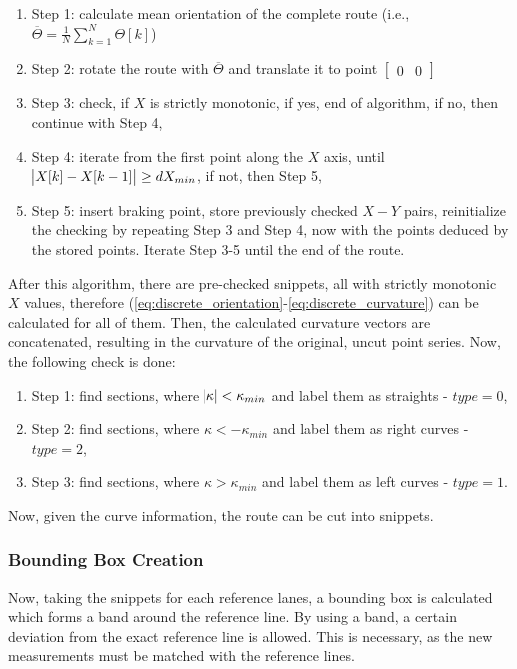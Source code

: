 \documentclass[sn-mathphys-num]{sn-jnl}%
\begin{document}
\begin{enumerate}
    \item Step 1: calculate mean orientation of the complete route (i.e., $\overline{\Theta} = \frac{1}{N}\sum_{k=1}^{N}\Theta[k]$)
    \item Step 2: rotate the route with $\overline{\Theta}$ and translate it to point $\begin{bmatrix}
        0 & 0 \end{bmatrix}$
    \item Step 3: check, if $X$ is strictly monotonic, if yes, end of algorithm, if no, then continue with Step 4,
    \item Step 4: iterate from the first point along the $X$ axis, until $\abs{X[k]-X[k-1]} \ge dX_{min}$, if not, then Step 5,
    \item Step 5: insert braking point, store previously checked $X-Y$ pairs, reinitialize the checking by repeating Step 3 and Step 4, now with the points deduced by the stored points. Iterate Step 3-5 until the end of the route.
\end{enumerate}
After this algorithm, there are pre-checked snippets, all with strictly monotonic $X$ values, therefore (\ref{eq:discrete_orientation}-\ref{eq:discrete_curvature}) can be calculated for all of them. Then, 
the calculated curvature vectors are concatenated, resulting in the curvature of the original, uncut point series. Now, the following check is done:
\begin{enumerate}
    \item Step 1: find sections, where $\abs{\kappa} < \kappa_{min}$ and label them as straights - $type = 0$,
    \item Step 2: find sections, where $\kappa < -\kappa_{min}$ and label them as right curves - $type = 2$,
    \item Step 3: find sections, where $\kappa > \kappa_{min}$ and label them as left curves - $type = 1$.
\end{enumerate}
Now, given the curve information, the route can be cut into snippets.
\newline \newline
{}

\subsubsection{Bounding Box Creation}
Now, taking the snippets for each reference lanes, a bounding box is calculated which forms a band around the reference line. By using a band, a certain deviation from 
the exact reference line is allowed. This is necessary, as the new measurements must be matched with the reference lines.
\newline \newline
{}
\end{document}
